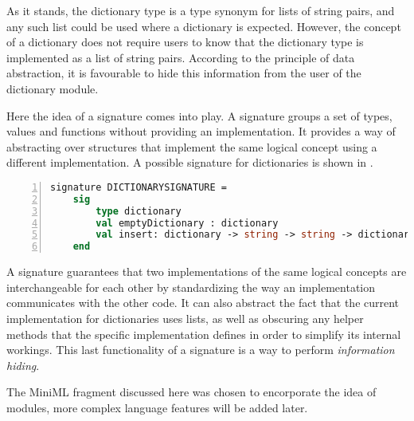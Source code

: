 As it stands, the dictionary type is a type synonym for lists of string pairs, and any such list could be used where a dictionary is expected.
However, the concept of a dictionary does not require users to know that the dictionary type is implemented as a list of string pairs.
According to the principle of data abstraction, it is favourable to hide this information from the user of the dictionary module.

Here the idea of a signature comes into play.
A signature groups a set of types, values and functions without providing an implementation.
It provides a way of abstracting over structures that implement the same logical concept using a different implementation.
A possible signature for dictionaries is shown in .
~
\begin{lstlisting}[frame=single, language=ML, caption=An example signature showing the declaration of a dictionary in ML, label=code:SignatureDictionaryExample, numbers=left]
signature DICTIONARYSIGNATURE =
    sig
        type dictionary
        val emptyDictionary : dictionary
        val insert: dictionary -> string -> string -> dictionary
    end
\end{lstlisting}

A signature guarantees that two implementations of the same logical concepts are interchangeable for each other by standardizing the way an implementation communicates with the other code.
It can also abstract the fact that the current implementation for dictionaries uses lists, as well as obscuring any helper methods that the specific implementation defines in order to simplify its internal workings.
This last functionality of a signature is a way to perform \emph{information hiding}.


The \mbox{MiniML} fragment discussed here was chosen to encorporate the idea of modules, more complex language features will be added later.

